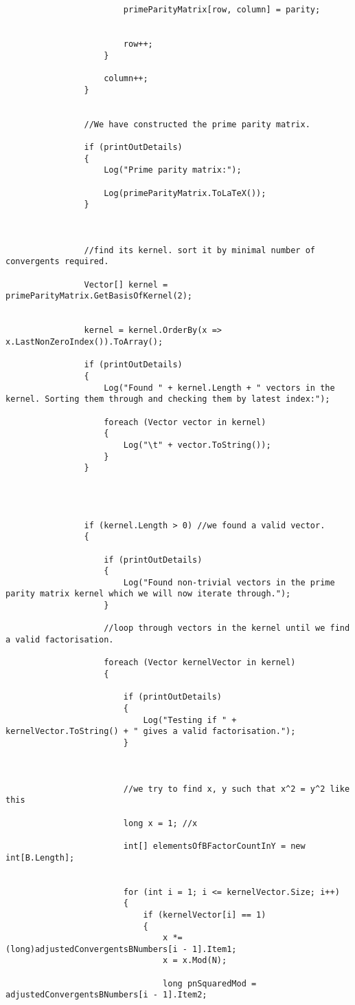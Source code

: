 \documentclass{article}
\begin{document}
\begin{lstlisting}
						primeParityMatrix[row, column] = parity;
						
						
						row++;
					}
					
					column++;
				}
				
				
				//We have constructed the prime parity matrix.
				
				if (printOutDetails)
				{
					Log("Prime parity matrix:");
					
					Log(primeParityMatrix.ToLaTeX());
				}
				
				
				
				//find its kernel. sort it by minimal number of convergents required.
				
				Vector[] kernel = primeParityMatrix.GetBasisOfKernel(2);
				
				
				kernel = kernel.OrderBy(x => x.LastNonZeroIndex()).ToArray();
				
				if (printOutDetails)
				{
					Log("Found " + kernel.Length + " vectors in the kernel. Sorting them through and checking them by latest index:");
					
					foreach (Vector vector in kernel)
					{
						Log("\t" + vector.ToString());
					}
				}
				
				
				
				
				if (kernel.Length > 0) //we found a valid vector.
				{
					
					if (printOutDetails)
					{
						Log("Found non-trivial vectors in the prime parity matrix kernel which we will now iterate through.");
					}
					
					//loop through vectors in the kernel until we find a valid factorisation.
					
					foreach (Vector kernelVector in kernel)
					{
						
						if (printOutDetails)
						{
							Log("Testing if " + kernelVector.ToString() + " gives a valid factorisation.");
						}
						
						
						
						//we try to find x, y such that x^2 = y^2 like this
						
						long x = 1; //x
						
						int[] elementsOfBFactorCountInY = new int[B.Length];
						
						
						for (int i = 1; i <= kernelVector.Size; i++)
						{
							if (kernelVector[i] == 1)
							{
								x *= (long)adjustedConvergentsBNumbers[i - 1].Item1;
								x = x.Mod(N);
								
								long pnSquaredMod = adjustedConvergentsBNumbers[i - 1].Item2;
								

\end{lstlisting}
\end{document}
